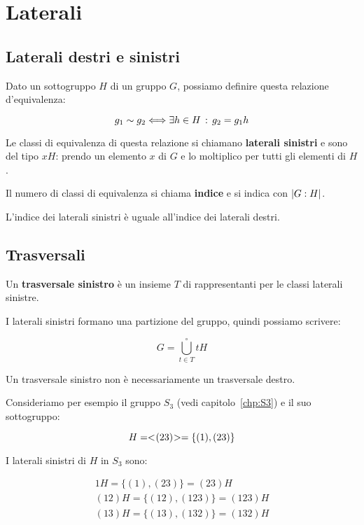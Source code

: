 \chapter{Laterali}

\section{Laterali destri e sinistri}

Dato un sottogruppo $H$ di un gruppo $G$, possiamo definire questa relazione d'equivalenza:

\begin{equation}
	g_1 \sim g_2 \Longleftrightarrow \exists h \in H \,:\, g_2 = g_1 h
\end{equation}

Le classi di equivalenza di questa relazione si chiamano \textbf{laterali sinistri} e sono del tipo $xH$: prendo un elemento $x$ di $G$ e lo moltiplico per tutti gli elementi di $H$.

Il numero di classi di equivalenza si chiama \textbf{indice} e si indica con $\lvert G:H \rvert$.

L'indice dei laterali sinistri è uguale all'indice dei laterali destri.

\section{Trasversali}

Un \textbf{trasversale sinistro} è un insieme $T$ di rappresentanti per le classi laterali sinistre.

I laterali sinistri formano una partizione del gruppo, quindi possiamo scrivere:

\begin{equation}
	G = \bigcup^\circ_{t \in T} tH
\end{equation}

Un trasversale sinistro non è necessariamente un trasversale destro.

Consideriamo per esempio il gruppo $S_3$ (vedi capitolo~\ref{chp:S3}) e il suo sottogruppo:

\begin{equation}
	H=< \negmedspace (23) \negmedspace > = \{(1), (23)\}
\end{equation} 

I laterali sinistri di $H$ in $S_3$ sono:

\begin{gather}
	1H = \{(1), (23)\} = (23)H \\
	(12)H = \{(12), (123)\} = (123)H \\
	(13)H = \{(13), (132)\} = (132)H
\end{gather}

